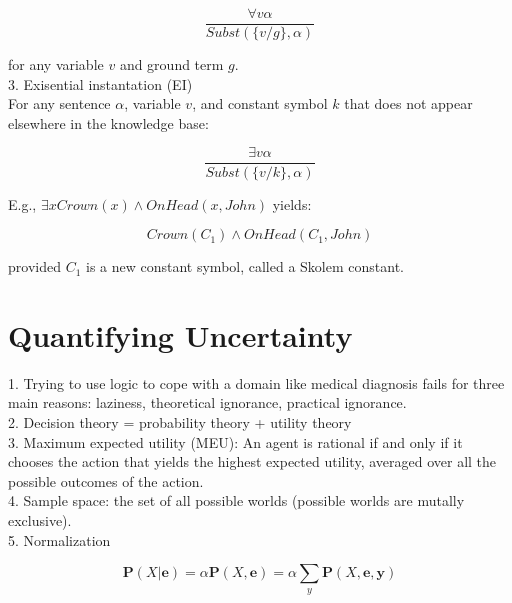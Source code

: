 \documentclass[12pt]{article}
\begin{document}
\begin{equation*}
  \frac {\forall v \alpha}{Subst(\{v/g\}, \alpha)}
\end{equation*}

for any variable $v$ and ground term $g$. \\

3. Exisential instantation (EI) \\

For any sentence $\alpha$, variable $v$, and constant symbol $k$ that does not appear elsewhere in the knowledge base:

\begin{equation*}
  \frac {\exists v \alpha}{Subst(\{v/k\}, \alpha)}
\end{equation*}

E.g., $\exists x Crown(x) \land OnHead(x, John)$ yields:

\begin{equation*}
  Crown(C_1) \land OnHead(C_1, John)
\end{equation*}

provided $C_1$ is a new constant symbol, called a Skolem constant.

\section*{Quantifying Uncertainty}

1. Trying to use logic to cope with a domain like medical diagnosis fails for three main reasons: laziness, theoretical ignorance, practical ignorance. \\

2. Decision theory = probability theory + utility theory \\

3. Maximum expected utility (MEU): An agent is rational if and only if it chooses the action that yields the highest expected utility, averaged over all the possible outcomes of the action. \\

4. Sample space: the set of all possible worlds (possible worlds are mutally exclusive). \\

5. Normalization

\begin{equation*}
\boldsymbol{P}(X|\boldsymbol{e}) =
\alpha \boldsymbol{P}(X, \boldsymbol{e}) = \alpha \sum_y \boldsymbol{P}(X, \boldsymbol{e}, \boldsymbol{y})
\end{equation*}
\end{document}
